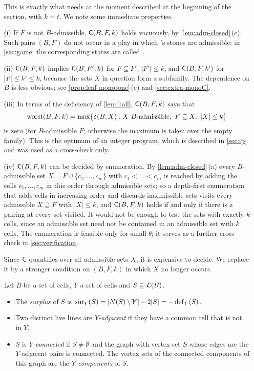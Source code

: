 This is exactly what \Breaker{} needs at the moment described at the beginning of the section, with
$k=t$. We note some immediate properties.

\begin{remark}\label{rem:C}
(i) If $F$ is not $B$-admissible, $\mathsf{C}(B,F,k)$ holds vacuously, by \cref{lem:adm-closed}\,(c). Such pairs
$(B,F)$ do not occur in a play in which \Maker's stones are admissible; in \cref{sec:game} the
corresponding states are called \VOID.

(ii) $\mathsf{C}(B,F,k)$ implies $\mathsf{C}(B,F',k)$ for $F\subseteq F'$, $|F'|\le k$, and $\mathsf{C}(B,F,k')$ for
$|F|\le k'\le k$, because the sets $X$ in question form a subfamily. The dependence on $B$ is less
obvious; see \cref{prop:leaf-monotone}\,(c) and \cref{sec:extra-monoC}.

(iii) In terms of the deficiency of \cref{lem:hall}, $\mathsf{C}(B,F,k)$ says that
\[
  \worst(B,F,k)=\max\{\delta(B,X) : X\ B\text{-admissible},\ F\subseteq X,\ |X|\le k\}
\]
is zero (for $B$-admissible $F$; otherwise the maximum is taken over the empty family). This is the
optimum of an integer program, which is described in \cref{sec:ip} and was used as a cross-check only.

(iv) $\mathsf{C}(B,F,k)$ can be decided by enumeration. By \cref{lem:adm-closed}\,(a) every $B$-admissible set
$X=F\cup\{c_1,\dots,c_m\}$ with $c_1<\dots<c_m$ is reached by adding the cells $c_1,\dots,c_m$ in this
order through admissible sets; so a depth-first enumeration that adds cells in increasing order and
discards inadmissible sets visits every admissible $X\supseteq F$ with $|X|\le k$, and $\mathsf{C}(B,F,k)$ holds if
and only if there is a pairing at every set visited. It would not be enough to test the sets with
exactly $k$ cells, since an admissible set need not be contained in an admissible set with $k$ cells. The
enumeration is feasible only for small $\theta$; it serves as a further cross-check in
\cref{sec:verification}.
\end{remark}

Since $\mathsf{C}$ quantifies over all admissible sets $X$, it is expensive to decide. We replace it by a
stronger condition on $(B,F,k)$ in which $X$ no longer occurs.

\begin{definition}\label{def:surplus}
Let $B$ be a set of cells, $Y$ a set of cells and $S\subseteq\mathcal{L}(B)$.
\begin{itemize}
\item The \emph{surplus} of $S$ is $\operatorname{sur}_Y(S)=|N(S)\setminus Y|-2|S|=-\operatorname{def}_Y(S)$.
\item Two distinct live lines are \emph{$Y$-adjacent} if they have a common cell that is not in $Y$.
\item $S$ is \emph{$Y$-connected} if $S\ne\emptyset$ and the graph with vertex set $S$ whose edges are
      the $Y$-adjacent pairs is connected. The vertex sets of the connected components of this graph are
      the \emph{$Y$-components} of $S$.
\end{itemize}
\end{definition}

